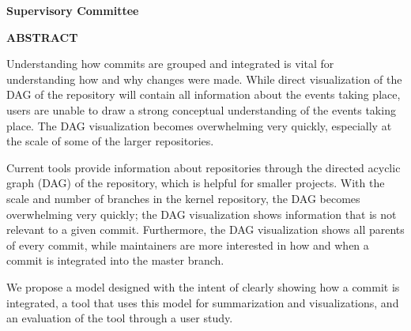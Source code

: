 \newpage
{}

\noindent \textbf{Supervisory Committee}
\tpbreak
\panel

\begin{center}
  \textbf{ABSTRACT}

  Understanding how commits are grouped and integrated is vital for
  understanding how and why changes were made. While direct
  visualization of the DAG of the repository will contain all
  information about the events taking place, users are unable to draw a
  strong conceptual understanding of the events taking place. The DAG
  visualization becomes overwhelming very quickly, especially at the
  scale of some of the larger repositories.


  Current tools provide information about repositories through the
  directed acyclic graph (DAG) of the repository, which is helpful for
  smaller projects. With the scale and number of branches in the kernel
  repository, the DAG becomes overwhelming very quickly; the DAG
  visualization shows information that is not relevant to a given
  commit. Furthermore, the DAG visualization shows all parents of every
  commit, while maintainers are more interested in how and when a commit
  is integrated into the master branch.

  We propose a model designed with the intent of clearly showing how a
  commit is integrated, a tool that uses this model for summarization
  and visualizations, and an evaluation of the tool through a user
  study.
\end{center}
